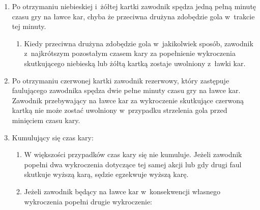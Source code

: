 \documentclass[12pt]{article}
\begin{document}
\begin{enumerate}
	\item Po otrzymaniu niebieskiej i~żółtej kartki zawodnik spędza jedną
	      pełną minutę czasu gry na ławce kar, chyba że przeciwna drużyna
	      zdobędzie gola w~trakcie tej minuty.

	      \begin{enumerate}
		      \item
		            Kiedy przeciwna drużyna zdobędzie gola w~jakikolwiek sposób,
		            zawodnik z~najkrótszym pozostałym czasem kary za popełnienie
		            wykroczenia skutkującego niebieską lub żółtą kartką zostaje
		            uwolniony z~ławki kar.
	      \end{enumerate}
	\item
	      Po otrzymaniu czerwonej kartki zawodnik rezerwowy, który zastępuje
	      faulującego zawodnika spędza dwie pełne minuty czasu gry na ławce kar.
	      Zawodnik przebywający na ławce kar za wykroczenie skutkujące czerwoną
	      kartką nie może zostać uwolniony w~przypadku strzelenia gola przed
	      minięciem czasu kary.
	\item
	      Kumulujący się czas kary:

	      \begin{enumerate}
		      \item
		            W większości przypadków czas kary się nie kumuluje. Jeżeli zawodnik
		            popełni dwa wykroczenia dotyczące tej samej akcji lub gdy drugi faul
		            skutkuje wyższą karą, sędzie egzekwuje wyższą karę.
		      \item
		            Jeżeli zawodnik będący na ławce kar w~konsekwencji własnego
		            wykroczenia popełni drugie wykroczenie:


\end{enumerate}
\end{enumerate}
\end{document}
